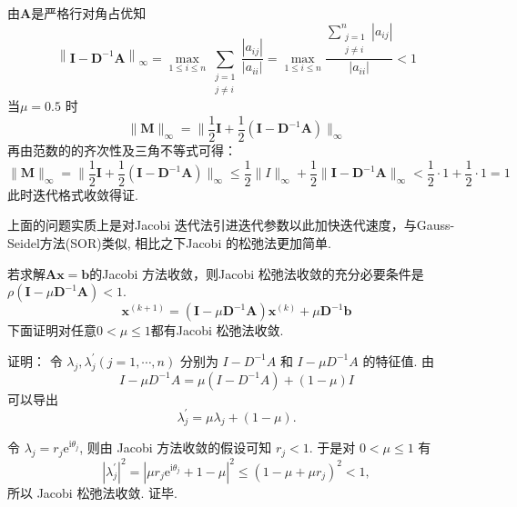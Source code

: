 \begin{tcolorbox}
由$\boldsymbol{A}$是严格行对角占优知
$$
\left\|\boldsymbol{I}-\boldsymbol{D}^{-1} \boldsymbol{A}\right\|_{\infty}=\max _{1 \leqslant i \leqslant n} \sum_{\substack{j=1 \\ j \neq i}} \frac{\left|a_{i j}\right|}{\left|a_{i i}\right|}=\max _{1 \leqslant i \leqslant n} \frac{\sum\limits_{\substack{j=1 \\ j \neq i}}^{n}\left|a_{i j}\right|}{\left|a_{i i}\right|}<1
$$
当$ {\mu}={0 . 5} $ 时
 $$\|\boldsymbol{M}\|_{\infty}=\|\frac12\boldsymbol{I} +\frac12( \boldsymbol{I}-\boldsymbol{D}^{-1}\boldsymbol{A}) \|_{\infty}$$
再由范数的的齐次性及三角不等式可得：
$$\|\boldsymbol{M}\|_{\infty}=\|\frac12\boldsymbol{I} +\frac12( \boldsymbol{I}-\boldsymbol{D}^{-1}\boldsymbol{A}) \|_{\infty}\leqslant \frac12 \|I\|_{\infty}+\frac12 \|\boldsymbol{I}-\boldsymbol{D}^{-1}\boldsymbol{A}\|_{\infty}<\frac 12\cdot1+\frac 12\cdot1=1$$
 此时迭代格式收敛得证.

\begin{tcolorbox}[breakable,title=Jacobi 松弛法]
上面的问题实质上是对Jacobi 迭代法引进迭代参数以此加快迭代速度，与Gauss-Seidel方法(SOR)类似, 相比之下Jacobi 的松弛法更加简单.

若求解$\boldsymbol{Ax=b}$的Jacobi 方法收敛，则Jacobi 松弛法收敛的充分必要条件是$\rho(\boldsymbol{I}-\mu \boldsymbol{D}^{-1}\boldsymbol{A})<1$.
$$
\boldsymbol{x}^{(k+1)}=(\boldsymbol{I}-\mu \boldsymbol{D}^{-1}\boldsymbol{A})\boldsymbol{x}^{(k)}+\mu \boldsymbol{D}^{-1}\boldsymbol{b}
$$
下面证明对任意$0<\mu\leqslant1$都有Jacobi 松弛法收敛.


    证明： 令 $ \lambda_{j}, \lambda_{j}^{'}(j=1, \cdots, n) $ 分别为 $ I-D^{-1} A $ 和 $ I-\mu D^{-1} A $ 的特征值. 由
$$
I-\mu D^{-1} A=\mu\left(I-D^{-1} A\right)+(1-\mu) I
$$
可以导出
$$
\lambda_{j}^{'}=\mu \lambda_{j}+(1-\mu) .
$$

令 $ \lambda_{j}=r_{j} \mathrm{e}^{\mathrm{i} \theta_{j}} $, 则由 Jacobi 方法收敛的假设可知 $ r_{j}<1 $. 于是对 $ 0<\mu \leqslant 1 $ 有
$$
\left|\lambda_{j}^{'}\right|^{2}=\left|\mu r_{j} \mathrm{e}^{\mathrm{i} \theta_{j}}+1-\mu\right|^{2} \leqslant\left(1-\mu+\mu r_{j}\right)^{2}<1,
$$
所以 Jacobi 松弛法收敛. 证毕.
\end{tcolorbox}


 
\end{tcolorbox}






